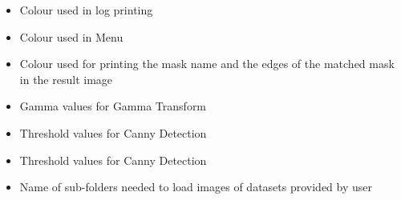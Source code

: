 \documentclass{article}
\begin{document}
\begin{itemize}
{\begin{itemize}
\item{Colour used in log printing}
\item{Colour used in Menu}
\item{Colour used for printing the mask name and the edges of the matched mask in the result image}
\item{Gamma values for Gamma Transform}
\item{Threshold values for Canny Detection}
\item{Threshold values for Canny Detection}
\item{Name of sub-folders needed to load images of datasets provided by user}
\end{itemize}
}
\end{itemize}
\end{document}

